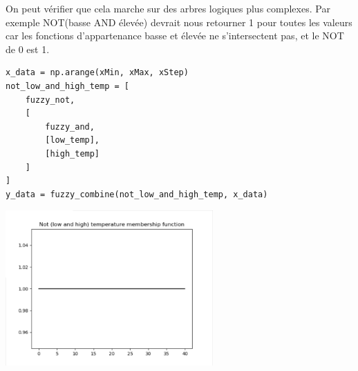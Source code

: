 \documentclass[11pt]{report}
\begin{document}
On peut vérifier que cela marche sur des arbres logiques plus complexes. Par exemple NOT(basse AND élevée) devrait nous retourner 1 pour toutes les valeurs car les fonctions d'appartenance basse et élevée ne s'intersectent pas, et le NOT de 0 est 1.
\begin{verbatim}
x_data = np.arange(xMin, xMax, xStep)
not_low_and_high_temp = [
    fuzzy_not,
    [
        fuzzy_and,
        [low_temp],
        [high_temp]
    ]
]
y_data = fuzzy_combine(not_low_and_high_temp, x_data)
\end{verbatim}
\begin{center}
\includegraphics[width=300px]{fuzzy_combine}
\end{center}
\end{document}

